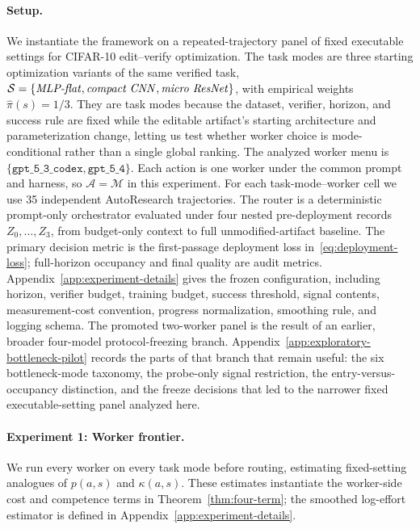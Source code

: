 \documentclass{article}
\newcommand{\cA}{\mathcal{A}}
\newcommand{\cM}{\mathcal{M}}
\newcommand{\cS}{\mathcal{S}}
\begin{document}
\paragraph{Setup.}
We instantiate the framework on a repeated-trajectory panel of fixed executable settings for CIFAR-10 edit--verify optimization.
The task modes are three starting optimization variants of the same verified task, \(\cS=\{\text{\textit{MLP-flat}},\text{\textit{compact CNN}},\text{\textit{micro ResNet}}\}\), with empirical weights \(\hat\pi(s)=1/3\).
They are task modes because the dataset, verifier, horizon, and success rule are fixed while the editable artifact's starting architecture and parameterization change, letting us test whether worker choice is mode-conditional rather than a single global ranking.
The analyzed worker menu is \(\{\texttt{gpt\_5\_3\_codex},\texttt{gpt\_5\_4}\}\).
Each action is one worker under the common prompt and harness, so \(\cA=\cM\) in this experiment.
For each task-mode--worker cell we use 35 independent AutoResearch trajectories.
The router is a deterministic prompt-only orchestrator evaluated under four nested pre-deployment records \(Z_0,\ldots,Z_3\), from budget-only context to full unmodified-artifact baseline.
The primary decision metric is the first-passage deployment loss in~\eqref{eq:deployment-loss}; full-horizon occupancy and final quality are audit metrics.
Appendix~\ref{app:experiment-details} gives the frozen configuration, including horizon, verifier budget, training budget, success threshold, signal contents, measurement-cost convention, progress normalization, smoothing rule, and logging schema.
The promoted two-worker panel is the result of an earlier, broader four-model protocol-freezing branch.
Appendix~\ref{app:exploratory-bottleneck-pilot} records the parts of that branch that remain useful: the six bottleneck-mode taxonomy, the probe-only signal restriction, the entry-versus-occupancy distinction, and the freeze decisions that led to the narrower fixed executable-setting panel analyzed here.

\paragraph{Experiment 1: Worker frontier.}
We run every worker on every task mode before routing, estimating fixed-setting analogues of \(p(a,s)\) and \(\kappa(a,s)\).
These estimates instantiate the worker-side cost and competence terms in Theorem~\ref{thm:four-term}; the smoothed log-effort estimator is defined in Appendix~\ref{app:experiment-details}.
\end{document}
